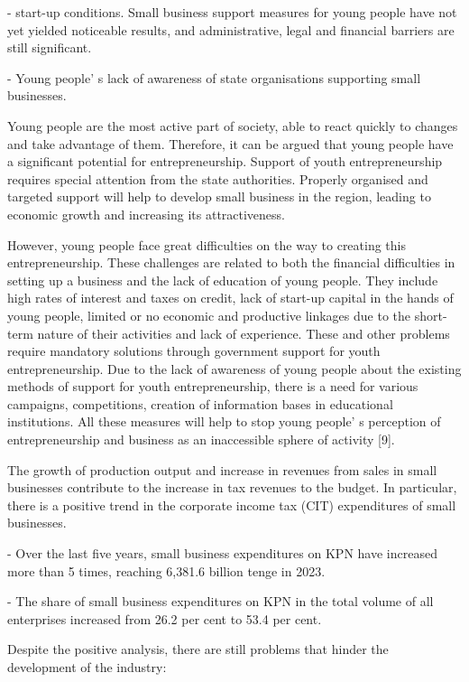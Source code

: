 \begin{multicols}{2}
- start-up conditions. Small business support measures for young people
have not yet yielded noticeable results, and administrative, legal and
financial barriers are still significant.

- Young people' s lack of awareness of state
organisations supporting small businesses.

Young people are the most active part of society, able to react quickly
to changes and take advantage of them. Therefore, it can be argued that
young people have a significant potential for entrepreneurship. Support
of youth entrepreneurship requires special attention from the state
authorities. Properly organised and targeted support will help to
develop small business in the region, leading to economic growth and
increasing its attractiveness.

However, young people face great difficulties on the way to creating
this entrepreneurship. These challenges are related to both the
financial difficulties in setting up a business and the lack of
education of young people. They include high rates of interest and taxes
on credit, lack of start-up capital in the hands of young people,
limited or no economic and productive linkages due to the short-term
nature of their activities and lack of experience. These and other
problems require mandatory solutions through government support for
youth entrepreneurship. Due to the lack of awareness of young people
about the existing methods of support for youth entrepreneurship, there
is a need for various campaigns, competitions, creation of information
bases in educational institutions. All these measures will help to stop
young people' s perception of entrepreneurship and
business as an inaccessible sphere of activity {[}9{]}.

The growth of production output and increase in revenues from sales in
small businesses contribute to the increase in tax revenues to the
budget. In particular, there is a positive trend in the corporate income
tax (CIT) expenditures of small businesses.

- Over the last five years, small business expenditures on KPN have
increased more than 5 times, reaching 6,381.6 billion tenge in 2023.

- The share of small business expenditures on KPN in the total volume of
all enterprises increased from 26.2 per cent to 53.4 per cent.

Despite the positive analysis, there are still problems that hinder the
development of the industry:


\end{multicols}
